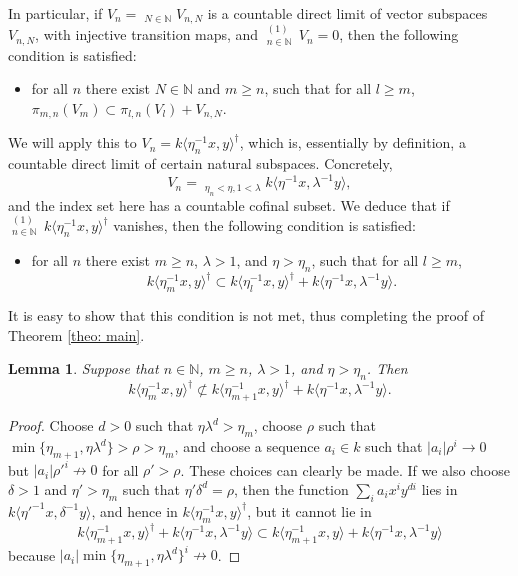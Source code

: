 \documentclass[11pt,leqno,a4paper]{amsart}
\newtheorem{lemma}[theorem]{Lemma}
\theoremstyle{remark}
\theoremstyle{definition}
\numberwithin{equation}{theorem}
\def\N{{\mathbb N}}
\def\limpro{\mathop{\lim\limits_{\displaystyle\leftarrow}}}
\def\limind{\mathop{\lim\limits_{\displaystyle\rightarrow}}}
\newcommand{\weak}[1]{\langle #1\rangle^\dagger}
\newcommand{\tate}[1]{\langle #1 \rangle}
\newcommand{\norm}[1]{\left\vert#1\right\vert}
\begin{document}
In particular, if $V_n=\limind_{N\in \N} V_{n,N}$ is a countable direct limit of vector subspaces $V_{n,N}$, with injective transition maps, and $\limpro_{n\in\N}^{(1)}\,V_n = 0$, then the following condition is satisfied:
\vspace{2mm}
\begin{itemize}\item for all $n$ there exist $N\in \N$ and $m\geq n$, such that for all $l\geq m$, $\pi_{m,n}(V_m)\subset \pi_{l,n}(V_l)+V_{n,N}$. 

\end{itemize}
\vspace{2mm}
We will apply this to $V_n= k\weak{\eta_n^{-1}x,y}$, which is, essentially by definition, a countable direct limit of certain natural subspaces. Concretely, 
\[ V_n = \limind_{\eta_n<\eta,1<\lambda}k\tate{\eta^{-1}x,\lambda^{-1}y},  \]
and the index set here has a countable cofinal subset. We deduce that if $\limpro_{n\in\N}^{(1)}\,k\weak{\eta_n^{-1}x,y}$ vanishes, then the following condition is satisfied:
\vspace{2mm}
\begin{itemize}\item for all $n$ there exist $m\geq n$, $\lambda>1$, and $\eta>\eta_n$, such that for all $l\geq m$, 
\[  k\weak{\eta_m^{-1}x,y} \subset k\weak{\eta_l^{-1}x,y} +  k\tate{\eta^{-1}x,\lambda^{-1}y}. \]
\end{itemize}
\vspace{2mm}
It is easy to show that this condition is not met, thus completing the proof of Theorem \ref{theo: main}.

\begin{lemma} \label{counterexample}
Suppose that $n\in \N$, $m\geq n$, $\lambda>1$, and $\eta>\eta_n$. Then
\[  k\weak{\eta_m^{-1}x,y} \not\subset k\weak{\eta_{m+1}^{-1}x,y} +  k\tate{\eta^{-1}x,\lambda^{-1}y}. \]
\end{lemma}

\begin{proof} Choose $d>0$ such that $\eta\lambda^d>\eta_m$, choose $\rho$ such that $\min\{\eta_{m+1},\eta\lambda^d\}>\rho>\eta_m$, and choose a sequence $a_i\in k$ such that $\norm{a_i}\rho^i\rightarrow 0$ but $\norm{a_i}\rho'^i\not\rightarrow 0$ for all $\rho'>\rho$. These choices can clearly be made. If we also choose $\delta>1$ and $\eta'>\eta_m$ such that $\eta'\delta^d=\rho$, then the function $\sum_i a_i x^iy^{di}$ lies in $k\tate{\eta'^{-1}x,\delta^{-1}y}$, and hence in $k\weak{\eta_m^{-1}x,y}$, but it cannot lie in
\[ k\weak{\eta_{m+1}^{-1}x,y} +  k\tate{\eta^{-1}x,\lambda^{-1}y}\subset k\tate{\eta_{m+1}^{-1}x,y}+ k\tate{\eta^{-1}x,\lambda^{-1}y} \]
because $\norm{a_i}\min\{\eta_{m+1},\eta\lambda^d\}^i \not\rightarrow 0$.
\end{proof}
\end{document}
